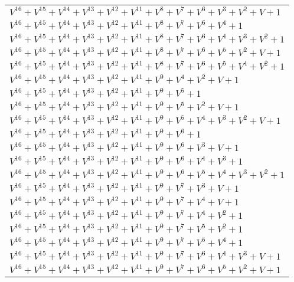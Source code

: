 \documentclass[12pt]{article}
\begin{document}
\begin{adjustwidth}{-4cm}{}
\begin{center}
\begin{longtable}{|l|}
$V^{16}  +V^{15}  +V^{14}  +V^{13}  +V^{12}  +V^{11}  +V^{8}  +V^{7}  +V^{6}  +V^{3}  +V^{2}  + V + 1$ \\
$V^{16}  +V^{15}  +V^{14}  +V^{13}  +V^{12}  +V^{11}  +V^{8}  +V^{7}  +V^{6}  +V^{4}  + 1$ \\
$V^{16}  +V^{15}  +V^{14}  +V^{13}  +V^{12}  +V^{11}  +V^{8}  +V^{7}  +V^{6}  +V^{4}  +V^{3}  +V^{2}  + 1$ \\
$V^{16}  +V^{15}  +V^{14}  +V^{13}  +V^{12}  +V^{11}  +V^{8}  +V^{7}  +V^{6}  +V^{5}  +V^{2}  + V + 1$ \\
$V^{16}  +V^{15}  +V^{14}  +V^{13}  +V^{12}  +V^{11}  +V^{8}  +V^{7}  +V^{6}  +V^{5}  +V^{4}  +V^{2}  + 1$ \\
$V^{16}  +V^{15}  +V^{14}  +V^{13}  +V^{12}  +V^{11}  +V^{9}  +V^{4}  +V^{2}  + V + 1$ \\
$V^{16}  +V^{15}  +V^{14}  +V^{13}  +V^{12}  +V^{11}  +V^{9}  +V^{5}  + 1$ \\
$V^{16}  +V^{15}  +V^{14}  +V^{13}  +V^{12}  +V^{11}  +V^{9}  +V^{5}  +V^{2}  + V + 1$ \\
$V^{16}  +V^{15}  +V^{14}  +V^{13}  +V^{12}  +V^{11}  +V^{9}  +V^{5}  +V^{4}  +V^{3}  +V^{2}  + V + 1$ \\
$V^{16}  +V^{15}  +V^{14}  +V^{13}  +V^{12}  +V^{11}  +V^{9}  +V^{6}  + 1$ \\
$V^{16}  +V^{15}  +V^{14}  +V^{13}  +V^{12}  +V^{11}  +V^{9}  +V^{6}  +V^{3}  + V + 1$ \\
$V^{16}  +V^{15}  +V^{14}  +V^{13}  +V^{12}  +V^{11}  +V^{9}  +V^{6}  +V^{4}  +V^{3}  + 1$ \\
$V^{16}  +V^{15}  +V^{14}  +V^{13}  +V^{12}  +V^{11}  +V^{9}  +V^{6}  +V^{5}  +V^{4}  +V^{3}  +V^{2}  + 1$ \\
$V^{16}  +V^{15}  +V^{14}  +V^{13}  +V^{12}  +V^{11}  +V^{9}  +V^{7}  +V^{3}  + V + 1$ \\
$V^{16}  +V^{15}  +V^{14}  +V^{13}  +V^{12}  +V^{11}  +V^{9}  +V^{7}  +V^{4}  + V + 1$ \\
$V^{16}  +V^{15}  +V^{14}  +V^{13}  +V^{12}  +V^{11}  +V^{9}  +V^{7}  +V^{4}  +V^{2}  + 1$ \\
$V^{16}  +V^{15}  +V^{14}  +V^{13}  +V^{12}  +V^{11}  +V^{9}  +V^{7}  +V^{5}  +V^{2}  + 1$ \\
$V^{16}  +V^{15}  +V^{14}  +V^{13}  +V^{12}  +V^{11}  +V^{9}  +V^{7}  +V^{5}  +V^{4}  + 1$ \\
$V^{16}  +V^{15}  +V^{14}  +V^{13}  +V^{12}  +V^{11}  +V^{9}  +V^{7}  +V^{6}  +V^{4}  +V^{3}  + V + 1$ \\
$V^{16}  +V^{15}  +V^{14}  +V^{13}  +V^{12}  +V^{11}  +V^{9}  +V^{7}  +V^{6}  +V^{5}  +V^{2}  + V + 1$ \\

\end{longtable}
\end{center}
\end{adjustwidth}
\end{document}
